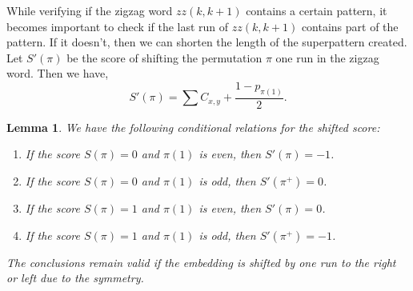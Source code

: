 \documentclass[a4paper,12pt]{article}
\newtheorem{lemma}[theorem]{Lemma}
\theoremstyle{definition}
\numberwithin{equation}{section}
\begin{document}
While verifying if the zigzag word $zz(k,k+1)$ contains a certain pattern, it becomes important to check if the last run of $zz(k,k+1)$ contains part of the pattern. If it doesn't, then we can shorten the length of the superpattern created. Let $S'(\pi)$ be the score of shifting the permutation $\pi$ one run in the zigzag word. Then we have, 
    \begin{equation}\label{shiftsc}
        S'(\pi) = \sum C_{x,y} + \frac{1 - p_{\pi(1)}}{2}. 
    \end{equation}
\begin{lemma} We have the following conditional relations for the shifted score:
\begin{enumerate}
    \item If the score $S(\pi) = 0$ and $\pi(1)$ is even, then $S'(\pi) =-1$. 
 
    \item  If the score $S(\pi) = 0$ and $\pi(1)$ is odd, then $S'(\pi^+)  = 0$.  
    
    \item If the score $S(\pi) = 1$ and $\pi(1)$ is even, then $S'(\pi) = 0$.  

    \item  If the score $S(\pi) = 1$ and $\pi(1)$ is odd, then  $S'(\pi^+)  = -1$.  
\end{enumerate}
The conclusions remain valid if the embedding is shifted by one run to the right or left due to the symmetry.
\end{lemma}\label{shifted_score}
\end{document}
